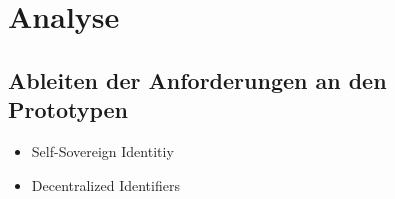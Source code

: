\section{Analyse}
\label{sec:analysis}
\subsection{Ableiten der Anforderungen an den Prototypen}
\label{sec:requirements_prototype}
    \begin{itemize}
        \item Self-Sovereign Identitiy
        \item Decentralized Identifiers
    \end{itemize}